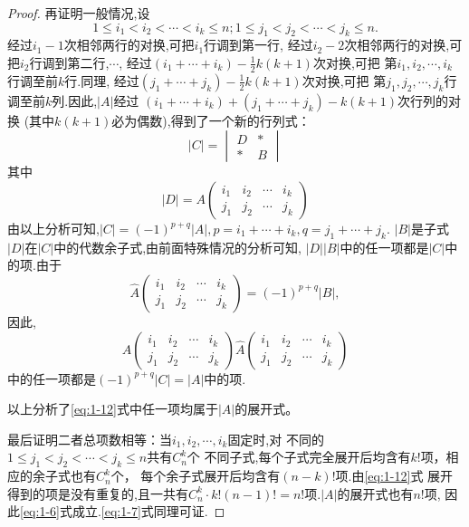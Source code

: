 \begin{proof}
  再证明一般情况,设
  \[ 1 \leq i_1 < i_2 < \cdots < i_k \leq n;1 \leq j_1 < j_2 < \cdots < j_k \leq n.\]
  经过$i_1-1$次相邻两行的对换,可把$i_1$行调到第一行,
  经过$i_2-2$次相邻两行的对换,可把$i_2$行调到第二行,$\cdots$,
  经过$(i_1+\cdots+i_k)-\frac{1}{2}k(k+1)$次对换,可把
  第$i_1,i_2,\cdots,i_k$行调至前$k$行.同理,
  经过$(j_1+\cdots+j_k)-\frac{1}{2}k(k+1)$次对换,可把
  第$j_1,j_2,\cdots,j_k$行调至前$k$列.因此,$|A|$经过
  $(i_1+\cdots+i_k)+(j_1+\cdots+j_k)-k(k+1)$次行列的对换
  (其中$k(k+1)$必为偶数),得到了一个新的行列式：
  \[
    |C|=\begin{vmatrix}
        D & *\\
        * & B%
        \end{vmatrix}
  \]
  其中
  \[
    |D|=A
    \begin{pmatrix}
      i_1 & i_2 & \cdots & i_k\\
      j_1 & j_2 & \cdots & j_k
    \end{pmatrix}
  \]
  由以上分析可知,$|C|=(-1)^{p+q}|A|,p=i_1+\cdots+i_k,q=j_1+\cdots+j_k.$
  $|B|$是子式$|D|$在$|C|$中的代数余子式,由前面特殊情况的分析可知,
  $|D||B|$中的任一项都是$|C|$中的项.由于
  \[\widehat{A}
    \begin{pmatrix}
      i_1 & i_2 & \cdots & i_k\\
      j_1 & j_2 & \cdots & j_k
    \end{pmatrix}
    =(-1)^{p+q}|B|,\]
  因此,
  \begin{equation}\label{eq:1-12}
  A
    \begin{pmatrix}
      i_1 & i_2 & \cdots & i_k\\
      j_1 & j_2 & \cdots & j_k
    \end{pmatrix}
    \widehat{A}
    \begin{pmatrix}
      i_1 & i_2 & \cdots & i_k\\
      j_1 & j_2 & \cdots & j_k
    \end{pmatrix}\end{equation}
  中的任一项都是$(-1)^{p+q}|C|=|A|$中的项.

  以上分析了\eqref{eq:1-12}式中任一项均属于$|A|$的展开式。

  最后证明二者总项数相等：当$i_1,i_2,\cdots,i_k$固定时,对
  不同的$1 \leq j_1 < j_2 < \cdots < j_k \leq n$共有$C_n^k$个
  不同子式,每个子式完全展开后均含有$k!$项，相应的余子式也有$C_n^k$个，
  每个余子式展开后均含有$(n-k)!$项.由\eqref{eq:1-12}式
  展开得到的项是没有重复的,且一共有$C_n^k\cdot k!(n-1)!=n!$项.$|A|$的展开式也有$n!$项,
  因此\eqref{eq:1-6}式成立.\eqref{eq:1-7}式同理可证.
\end{proof}
